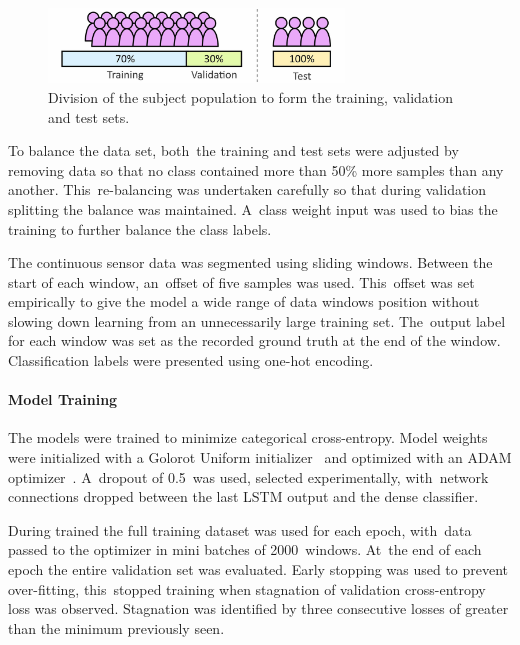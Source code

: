 \begin{figure}[!hbt]
    \centering
    \includegraphics[width=0.7\textwidth]{content/4-LSTM_Behaviour/test_train_split.jpg}
    \caption{Division of the subject population to form the training, validation and test sets.}
    \label{fig:test_training_split}
\end{figure}

To balance the data set, both~the training and test sets were adjusted by removing data so that no class contained more than 50\% more samples than any another. This~re-balancing was undertaken carefully so that during validation splitting the balance was maintained. A~class weight input was used to bias the training to further balance the class labels.

The continuous sensor data was segmented using sliding windows. Between the start of each window, an~offset of five samples was used. This~offset was set empirically to give the model a wide range of data windows position without slowing down learning from an unnecessarily large training set. The~output label for each window was set as the recorded ground truth at the end of the window. Classification labels were presented using one-hot encoding.

\paragraph{Model Training}
The models were trained to minimize categorical cross-entropy. Model weights were initialized with a Golorot Uniform initializer~\cite{Glorot2010} and optimized with an ADAM optimizer~\cite{Kingma2015}. A~dropout of 0.5~was used, selected experimentally, with~network connections dropped between the last LSTM output and the dense classifier.

During trained the full training dataset was used for each epoch, with~data passed to the optimizer in mini batches of 2000~windows. At~the end of each epoch the entire validation set was evaluated. Early stopping was used to prevent over-fitting, this~stopped training when stagnation of validation cross-entropy loss was observed. Stagnation was identified by three consecutive losses of greater than the minimum previously seen.

